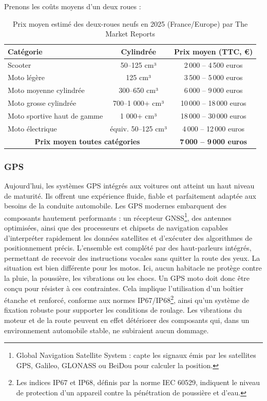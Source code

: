 Prenons les coûts moyens d'un deux roues :\\
\begin{table}[ht]
\centering
\begin{tabular}{|l|c|c|}
\hline
\textbf{Catégorie} & \textbf{Cylindrée} & \textbf{Prix moyen (TTC, €)} \\
\hline
Scooter & 50--125 cm³ & 2\,000 -- 4\,500 euros \\
Moto légère & 125 cm³ & 3\,500 -- 5\,000 euros \\
Moto moyenne cylindrée & 300--650 cm³ & 6\,000 -- 9\,000 euros \\
Moto grosse cylindrée & 700--1 000+ cm³ & 10\,000 -- 18\,000 euros \\
Moto sportive haut de gamme & 1 000+ cm³ & 18\,000 -- 30\,000 euros \\
Moto électrique & équiv. 50--125 cm³ & 4\,000 -- 12\,000 euros \\
\hline
\multicolumn{2}{|c|}{\textbf{Prix moyen toutes catégories}} & \textbf{7\,000 -- 9\,000 euros} \\
\hline
\end{tabular}
\caption{Prix moyen estimé des deux-roues neufs en 2025 (France/Europe) par The Market Reports}
\end{table}

\subsubsection{GPS}
Aujourd’hui, les systèmes GPS intégrés aux voitures ont atteint un haut niveau de maturité. Ils offrent une expérience fluide, fiable et parfaitement adaptée aux besoins de la conduite automobile. Les GPS modernes embarquent des composants hautement performants : un récepteur GNSS\footnote{Global Navigation Satellite System : capte les signaux émis par les satellites GPS, Galileo, GLONASS ou BeiDou pour calculer la position.}, des antennes optimisées, ainsi que des processeurs et chipsets de navigation capables d’interpréter rapidement les données satellites et d’exécuter des algorithmes de positionnement précis. L’ensemble est complété par des haut-parleurs intégrés, permettant de recevoir des instructions vocales sans quitter la route des yeux.
La situation est bien différente pour les motos. Ici, aucun habitacle ne protège contre la pluie, la poussière, les vibrations ou les chocs. Un GPS moto doit donc être conçu pour résister à ces contraintes. Cela implique l’utilisation d’un boîtier étanche et renforcé, conforme aux normes IP67/IP68\footnote{Les indices IP67 et IP68, définis par la norme IEC 60529, indiquent le niveau de protection d’un appareil contre la pénétration de poussière et d’eau.}, ainsi qu’un système de fixation robuste pour supporter les conditions de roulage. Les vibrations du moteur et de la route peuvent en effet détériorer des composants qui, dans un environnement automobile stable, ne subiraient aucun dommage.


